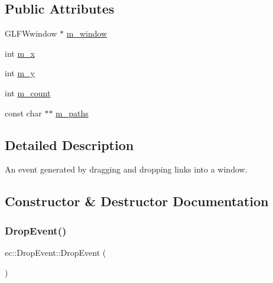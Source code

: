 \subsection*{Public Attributes}
\begin{DoxyCompactItemize}
\item 
G\+L\+F\+Wwindow $\ast$ \mbox{\hyperlink{structec_1_1_drop_event_a526c7694184ab65111ca5f8f4f2384fa}{m\+\_\+window}}
\item 
int \mbox{\hyperlink{structec_1_1_drop_event_ae1b8807808b78aecbdb27d51a4ab87eb}{m\+\_\+x}}
\item 
int \mbox{\hyperlink{structec_1_1_drop_event_a59338dd4b8cd47b7f025908a63be2e92}{m\+\_\+y}}
\item 
int \mbox{\hyperlink{structec_1_1_drop_event_a63c1174cdefa0a30b15667c9fa070a41}{m\+\_\+count}}
\item 
const char $\ast$$\ast$ \mbox{\hyperlink{structec_1_1_drop_event_ad7bdb28144cd5ccb2c13c4dbacff40cb}{m\+\_\+paths}}
\end{DoxyCompactItemize}


\subsection{Detailed Description}
An event generated by dragging and dropping links into a window. 

\subsection{Constructor \& Destructor Documentation}
\mbox{\label{structec_1_1_drop_event_a6ae6f5be022c3809bc204c365dc11cbc}} 
\subsubsection{\texorpdfstring{Drop\+Event()}{DropEvent()}\hspace{0.1cm}{\footnotesize\ttfamily [1/2]}}
{\footnotesize\ttfamily ec\+::\+Drop\+Event\+::\+Drop\+Event (\begin{DoxyParamCaption}{ }\end{DoxyParamCaption})\hspace{0.3cm}{\ttfamily [explicit]}}

\mbox{\label{structec_1_1_drop_event_a955d74612461f4100890101ddd1c2528}} 
